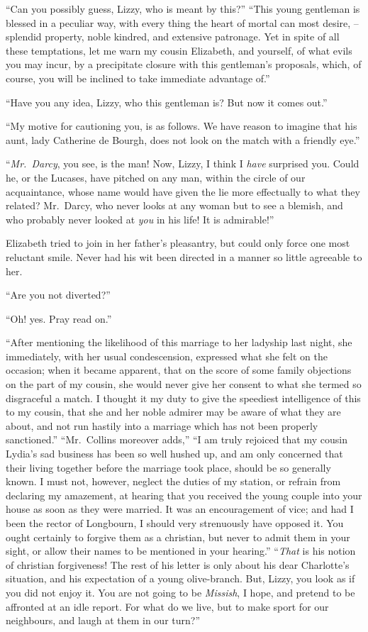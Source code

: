 “Can you possibly guess, Lizzy, who is meant by
this?” “This young gentleman is blessed in a peculiar
way, with every thing the heart of mortal can most
desire, -- splendid property, noble kindred, and extensive
patronage. Yet in spite of all these temptations, let me
warn my cousin Elizabeth, and yourself, of what evils you
may incur, by a precipitate closure with this gentleman’s
proposals, which, of course, you will be inclined to take
immediate advantage of.”

“Have you any idea, Lizzy, who this gentleman is?
But now it comes out.”

“My motive for cautioning you, is as follows. We have
reason to imagine that his aunt, lady Catherine de Bourgh,
does not look on the match with a friendly eye.”

“\textit{Mr.\ Darcy}, you see, is the man! Now, Lizzy, I think
I \textit{have} surprised you. Could he, or the Lucases, have
pitched on any man, within the circle of our acquaintance,
whose name would have given the lie more effectually to
what they related? Mr.\ Darcy, who never looks at any
woman but to see a blemish, and who probably never
looked at \textit{you} in his life! It is admirable!”

Elizabeth tried to join in her father’s pleasantry, but
could only force one most reluctant smile. Never had his
wit been directed in a manner so little agreeable to her.

“Are you not diverted?”

“Oh! yes. Pray read on.”

“After mentioning the likelihood of this marriage to
her ladyship last night, she immediately, with her usual
condescension, expressed what she felt on the occasion;
when it became apparent, that on the score of some family
objections on the part of my cousin, she would never give
her consent to what she termed so disgraceful a match.
I thought it my duty to give the speediest intelligence of
this to my cousin, that she and her noble admirer may be
aware of what they are about, and not run hastily into
a marriage which has not been properly sanctioned.”
“Mr.\ Collins moreover adds,” “I am truly rejoiced that
my cousin Lydia’s sad business has been so well hushed
up, and am only concerned that their living together
before the marriage took place, should be so generally
known. I must not, however, neglect the duties of my
station, or refrain from declaring my amazement, at
hearing that you received the young couple into your
house as soon as they were married. It was an encouragement
of vice; and had I been the rector of Longbourn,
I should very strenuously have opposed it. You ought
certainly to forgive them as a christian, but never to
admit them in your sight, or allow their names to be
mentioned in your hearing.” “\textit{That} is his notion of
christian forgiveness! The rest of his letter is only about
his dear Charlotte’s situation, and his expectation of a
young olive-branch. But, Lizzy, you look as if you did
not enjoy it. You are not going to be \textit{Missish}, I hope,
and pretend to be affronted at an idle report. For what
do we live, but to make sport for our neighbours, and
laugh at them in our turn?”

